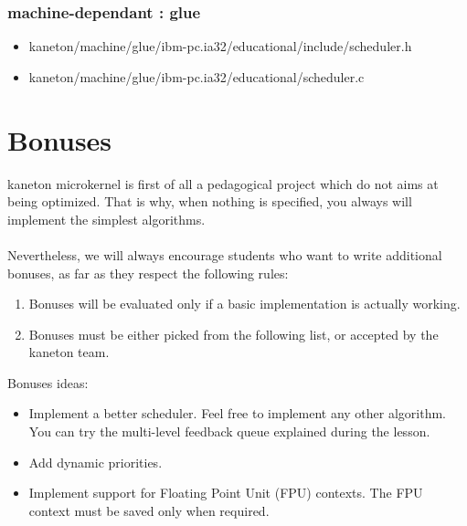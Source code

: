 \subsubsection{\color{filerefcolor} machine-dependant : glue}
\begin{itemize}
\item kaneton/machine/glue/ibm-pc.ia32/educational/include/scheduler.h
\item kaneton/machine/glue/ibm-pc.ia32/educational/scheduler.c
\end{itemize}

%
%

\newpage

\section{Bonuses}

kaneton microkernel is first of all a pedagogical project which do not
aims at being optimized. That is why, when nothing is specified, you
always will implement the simplest algorithms.\\
\\
Nevertheless, we will always encourage students who want to write
additional bonuses, as far as they respect the following rules:

\begin{enumerate}
  \item Bonuses will be evaluated only if a basic implementation is
  actually working.
  \item Bonuses must be either picked from the following list, or
  accepted by the kaneton team.\\
\end{enumerate}

Bonuses ideas:
\begin{itemize}
\item
  Implement a better scheduler. Feel free to implement any other
  algorithm. You can try the multi-level feedback queue explained
  during the lesson.

\item
  Add dynamic priorities.

\item
  Implement support for Floating Point Unit (FPU) contexts. The FPU
  context must be saved only when required.
\end{itemize}

%
%

\newpage

